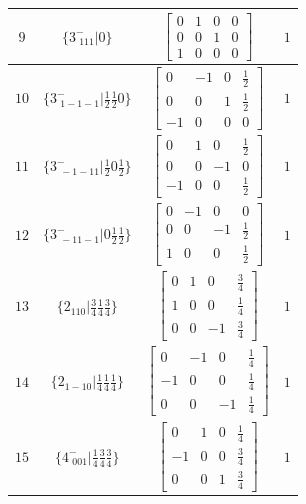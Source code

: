 \documentclass[fleqn,8pt]{jsarticle}
\begin{document}
\begin{longtable}{cccc}
$ 9 $ & $ \{3^{-}_{\,\,111}|0\} $ & $ \begin{bmatrix} 0 & 1 & 0 & 0 \\ 0 & 0 & 1 & 0 \\ 1 & 0 & 0 & 0 \end{bmatrix} $ & $ 1 $ \\ \hline
$ 10 $ & $ \{3^{-}_{\,\,1-1-1}|\frac{1}{2} \frac{1}{2} 0\} $ & $ \begin{bmatrix} 0 & -1 & 0 & \frac{1}{2} \\ 0 & 0 & 1 & \frac{1}{2} \\ -1 & 0 & 0 & 0 \end{bmatrix} $ & $ 1 $ \\ \hline
$ 11 $ & $ \{3^{-}_{\,\,-1-11}|\frac{1}{2} 0 \frac{1}{2}\} $ & $ \begin{bmatrix} 0 & 1 & 0 & \frac{1}{2} \\ 0 & 0 & -1 & 0 \\ -1 & 0 & 0 & \frac{1}{2} \end{bmatrix} $ & $ 1 $ \\ \hline
$ 12 $ & $ \{3^{-}_{\,\,-11-1}|0 \frac{1}{2} \frac{1}{2}\} $ & $ \begin{bmatrix} 0 & -1 & 0 & 0 \\ 0 & 0 & -1 & \frac{1}{2} \\ 1 & 0 & 0 & \frac{1}{2} \end{bmatrix} $ & $ 1 $ \\ \hline
$ 13 $ & $ \{2{}_{110}|\frac{3}{4} \frac{1}{4} \frac{3}{4}\} $ & $ \begin{bmatrix} 0 & 1 & 0 & \frac{3}{4} \\ 1 & 0 & 0 & \frac{1}{4} \\ 0 & 0 & -1 & \frac{3}{4} \end{bmatrix} $ & $ 1 $ \\ \hline
$ 14 $ & $ \{2{}_{1-10}|\frac{1}{4} \frac{1}{4} \frac{1}{4}\} $ & $ \begin{bmatrix} 0 & -1 & 0 & \frac{1}{4} \\ -1 & 0 & 0 & \frac{1}{4} \\ 0 & 0 & -1 & \frac{1}{4} \end{bmatrix} $ & $ 1 $ \\ \hline
$ 15 $ & $ \{4^{-}_{\,\,001}|\frac{1}{4} \frac{3}{4} \frac{3}{4}\} $ & $ \begin{bmatrix} 0 & 1 & 0 & \frac{1}{4} \\ -1 & 0 & 0 & \frac{3}{4} \\ 0 & 0 & 1 & \frac{3}{4} \end{bmatrix} $ & $ 1 $ \\ \hline

\end{longtable}
\end{document}
